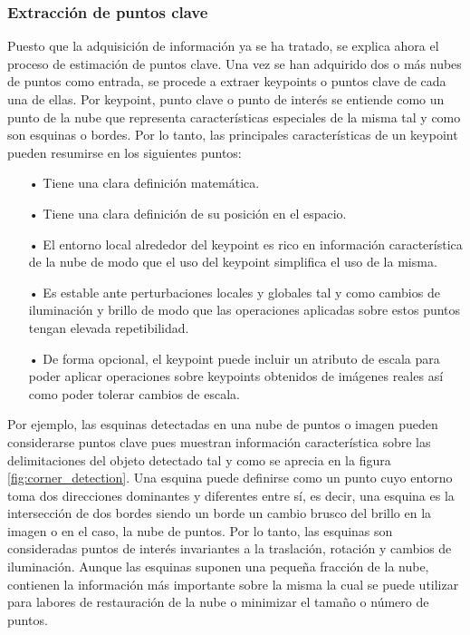 \subsubsection{Extracción de puntos clave}
Puesto que la adquisición de información ya se ha tratado, se explica ahora el proceso de estimación de puntos clave. Una vez se han adquirido dos o más nubes de puntos como entrada, se procede a extraer keypoints o puntos clave de cada una de ellas. Por keypoint, punto clave o punto de interés se entiende como un punto de la nube que representa características especiales de la misma tal y como son esquinas o bordes. Por lo tanto, las principales características de un keypoint pueden resumirse en los siguientes puntos:


\begin{itemize}
\item[•] Tiene una clara definición matemática.
\item[•] Tiene una clara definición de su posición en el espacio.
\item[•] El entorno local alrededor del keypoint es rico en información característica de la nube de modo que el uso del keypoint simplifica el uso de la misma.
\item[•] Es estable ante perturbaciones locales y globales tal y como cambios de iluminación y brillo de modo que las operaciones aplicadas sobre estos puntos tengan elevada repetibilidad.
\item[•] De forma opcional, el keypoint puede incluir un atributo de escala para poder aplicar operaciones sobre keypoints obtenidos de imágenes reales así como poder tolerar cambios de escala.
\end{itemize}


Por ejemplo, las esquinas detectadas en una nube de puntos o imagen pueden considerarse puntos clave pues muestran información característica sobre las delimitaciones del objeto detectado tal y como se aprecia en la figura \ref{fig:corner_detection}. Una esquina puede definirse como un punto cuyo entorno toma dos direcciones dominantes y diferentes entre sí, es decir, una esquina es la intersección de dos bordes siendo un borde un cambio brusco del brillo en la imagen o en el caso, la nube de puntos. Por lo tanto, las esquinas son consideradas puntos de interés invariantes a la traslación, rotación y cambios de iluminación. 
Aunque las esquinas suponen una pequeña fracción de la nube, contienen la información más importante sobre la misma la cual se puede utilizar para labores de restauración de la nube o minimizar el tamaño o número de puntos.

